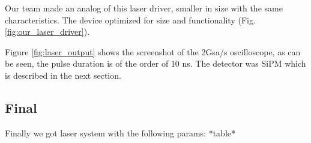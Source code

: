 


Our team made an analog of this laser driver, smaller in size with the same characteristics. The device optimized for size and functionality (Fig. \ref{fig:our_laser_driver}).

Figure \ref{fig:laser_output} shows the screenshot of the 2Gsa/s oscilloscope, as can be seen, the pulse duration is of the order of 10 ns. The detector was SiPM which is described in the next section.

\begin{figure}
\begin{floatrow}
\end{floatrow}
\end{figure}






\subsection{Final}

Finally we got laser system with the following params:
*table*

